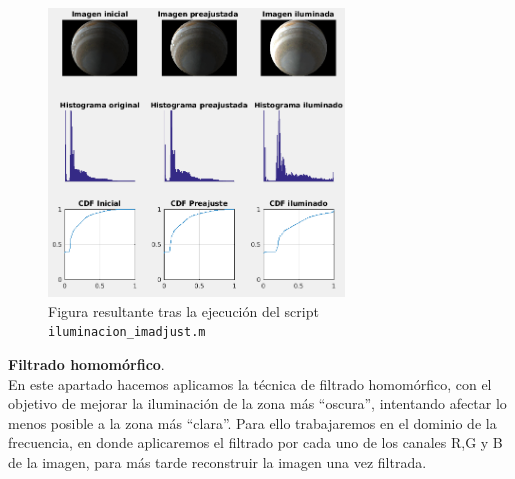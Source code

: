 \documentclass[12pt]{article}
\begin{document}
	\begin{figure}[h]
		\begin{center}
			\includegraphics[width=0.7\textwidth]{img/iluminacion_imadjust.png}
			\caption{Figura resultante tras la ejecución del script \texttt{iluminacion\_imadjust.m}}
			\label{img: iluminacion imadjust}
		\end{center}
	\end{figure}
	
	\pagebreak
	
	\noindent \textbf{\large Filtrado homomórfico}. \\ 
	
	\noindent En este apartado hacemos aplicamos la técnica de filtrado homomórfico, con el objetivo de mejorar la iluminación de la zona más ``oscura'', intentando afectar lo menos posible a la zona más ``clara''. Para ello trabajaremos en el dominio de la frecuencia, en donde aplicaremos el filtrado por cada uno de los canales R,G y B de la imagen, para más tarde reconstruir la imagen una vez filtrada. \\
	
\end{document}
